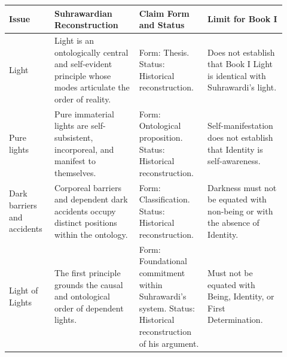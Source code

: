 
%

\begin{table}[htbp]
\centering
\small
\renewcommand{\arraystretch}{1.25}

\begin{tabular}{
    p{0.15\linewidth}
    p{0.29\linewidth}
    p{0.22\linewidth}
    p{0.26\linewidth}
}
\toprule
\textbf{Issue}
&
\textbf{Suhrawardian Reconstruction}
&
\textbf{Claim Form and Status}
&
\textbf{Limit for Book I}
\\
\midrule

Light
&
Light is an ontologically central and self-evident principle
whose modes articulate the order of reality.
&
Form: Thesis.
Status: Historical reconstruction.
&
Does not establish that Book I Light is identical with
Suhrawardi's light.
\\

Pure lights
&
Pure immaterial lights are self-subsistent, incorporeal,
and manifest to themselves.
&
Form: Ontological proposition.
Status: Historical reconstruction.
&
Self-manifestation does not establish that Identity
is self-awareness.
\\

Dark barriers and accidents
&
Corporeal barriers and dependent dark accidents occupy
distinct positions within the ontology.
&
Form: Classification.
Status: Historical reconstruction.
&
Darkness must not be equated with non-being or with
the absence of Identity.
\\

Light of Lights
&
The first principle grounds the causal and ontological
order of dependent lights.
&
Form: Foundational commitment within Suhrawardi's system.
Status: Historical reconstruction of his argument.
&
Must not be equated with Being, Identity, or
First Determination.
\\


\end{tabular}
\end{table}
